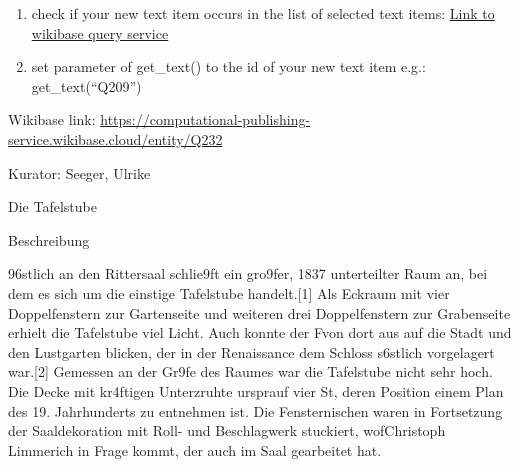 \documentclass[
  letterpaper,
]{book}
\begin{document}
\begin{enumerate}
\def\labelenumi{\arabic{enumi}.}
\setcounter{enumi}{1}
\item
  check if your new text item occurs in the list of selected text items:
  \href{https://computational-publishing-service.wikibase.cloud/query/\#PREFIX\%20cps\%3A\%20\%3Chttps\%3A\%2F\%2Fcomputational-publishing-service.wikibase.cloud\%2Fentity\%2F\%3E\%0APREFIX\%20cpss\%3A\%20\%3Chttps\%3A\%2F\%2Fcomputational-publishing-service.wikibase.cloud\%2Fentity\%2Fstatement\%2F\%3E\%0APREFIX\%20cpsv\%3A\%20\%3Chttps\%3A\%2F\%2Fcomputational-publishing-service.wikibase.cloud\%2Fvalue\%2F\%3E\%0APREFIX\%20cpspt\%3A\%20\%3Chttps\%3A\%2F\%2Fcomputational-publishing-service.wikibase.cloud\%2Fprop\%2Fdirect\%2F\%3E\%0APREFIX\%20cpsp\%3A\%20\%3Chttps\%3A\%2F\%2Fcomputational-publishing-service.wikibase.cloud\%2Fprop\%2F\%3E\%0APREFIX\%20cpsps\%3A\%20\%3Chttps\%3A\%2F\%2Fcomputational-publishing-service.wikibase.cloud\%2Fprop\%2Fstatement\%2F\%3E\%0APREFIX\%20cpspq\%3A\%20\%3Chttps\%3A\%2F\%2Fcomputational-publishing-service.wikibase.cloud\%2Fprop\%2Fqualifier\%2F\%3E\%0A\%0ASELECT\%20\%3FtextItem\%20\%3FkuratorLabel\%20\%3FtextUrl\%0AWHERE\%0A\%7B\%0A\%20\%20\%3FtextItem\%20cpsp\%3AP46\%20\%3FkuratorStatement.\%20\%0A\%20\%20\%3FkuratorStatement\%20cpsps\%3AP46\%20\%3FkuratorItem.\%20\%0A\%20\%20\%3FkuratorItem\%20rdfs\%3Alabel\%20\%3FkuratorLabel.\%0A\%20\%20\%3FtextItem\%20cpsp\%3AP57\%20\%3Furlstatement.\%20\%0A\%20\%20\%3Furlstatement\%20cpsps\%3AP57\%20\%3FtextUrl.\%20\%0A\%7D}{Link
  to wikibase query service}
\item
  set parameter of get\_text() to the id of your new text item e.g.:
  get\_text(``Q209'')
\end{enumerate}

Wikibase link:
\url{https://computational-publishing-service.wikibase.cloud/entity/Q232}

Kurator: Seeger, Ulrike

Die Tafelstube

Beschreibung

\x96stlich an den Rittersaal schlie\x9ft ein gro\x9fer, 1837
unterteilter Raum an, bei dem es sich um die einstige Tafelstube
handelt.{[}1{]} Als Eckraum mit vier Doppelfenstern zur Gartenseite und
weiteren drei Doppelfenstern zur Grabenseite erhielt die Tafelstube viel
Licht. Auch konnte der F\xbcrst von dort aus auf die Stadt und den
Lustgarten blicken, der in der Renaissance dem Schloss
s\xbcd{}\xb6stlich vorgelagert war.{[}2{]} Gemessen an der
Gr\x9fe des Raumes war die Tafelstube nicht sehr hoch. Die
Decke mit kr\xa4ftigen Unterz\xbcgen ruhte
urspr\xbcnglich auf vier St\xbctzen, deren Position einem Plan
des 19. Jahrhunderts zu entnehmen ist. Die Fensternischen waren in
Fortsetzung der Saaldekoration mit Roll- und Beschlagwerk stuckiert,
wof\xbcr Christoph Limmerich in Frage kommt, der auch im Saal
gearbeitet hat.
\end{document}
